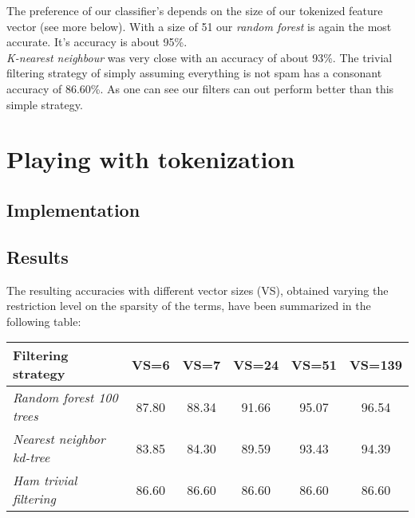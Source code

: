 \documentclass[12pt,a4paper]{article}
\begin{document}
\begin{singlespace}
The preference of our classifier's depends on the size of our tokenized feature vector (see more below). With a size of 51 our \emph{random forest} is again the most accurate. It's accuracy is about 95\%. \\

\emph{K-nearest neighbour} was very close with an accuracy of about 93\%. The trivial filtering strategy of simply assuming everything is not spam has a consonant accuracy of 86.60\%. As one can see our filters can out perform better than this simple strategy. 


\newpage
\section{Playing with tokenization}
\subsection{Implementation}

\subsection{Results}

The resulting accuracies with different vector sizes (VS), obtained varying the restriction level on the sparsity of the terms, have been summarized in the following table:

\begin{center}
    \begin{tabular}{ | l | c | c | c | c | c |}
    \hline
    \textbf{Filtering strategy}  & \textbf{VS=6} & \textbf{VS=7} & \textbf{VS=24} & \textbf{VS=51} & \textbf{VS=139}  \\ \hline \hline
    \emph{Random forest 100 trees} & 87.80 & 88.34 & 91.66 & 95.07 & 96.54   \\ \hline
    \emph{Nearest neighbor kd-tree} & 83.85 & 84.30 & 89.59 & 93.43 & 94.39  \\ \hline
    \emph{Ham trivial filtering} & 86.60 & 86.60 & 86.60 & 86.60 & 86.60 \\ \hline
    \end{tabular}
\end{center}


\end{singlespace}
\end{document}
